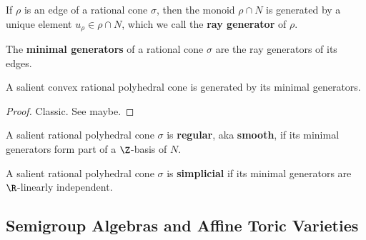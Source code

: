 \begin{definition}
  \label{1-2-ray-gen}

  If $\rho$ is an edge of a rational cone $\sigma$, then the monoid $\rho \cap N$ is generated by a unique element $u_\rho \in \rho \cap N$, which we call the {\bf ray generator} of $\rho$.
\end{definition}


\begin{definition}
  \label{1-2-min-gen}

  The {\bf minimal generators} of a rational cone $\sigma$ are the ray generators of its edges.
\end{definition}


\begin{lemma}
  \label{1-2-15-cone-hull-min-gen}

  A salient convex rational polyhedral cone is generated by its minimal generators.
\end{lemma}
\begin{proof}

  Classic. See \cite{Oda_1988} maybe.
\end{proof}


\begin{definition}
  \label{1-2-16-reg-cone}

  A salient rational polyhedral cone $\sigma$ is {\bf regular}, aka {\bf smooth}, if its minimal generators form part of a $\Z$-basis of $N$.
\end{definition}


\begin{definition}
  \label{1-2-16-simplicial-cone}

  A salient rational polyhedral cone $\sigma$ is {\bf simplicial} if its minimal generators are $\R$-linearly independent.
\end{definition}


\subsection{Semigroup Algebras and Affine Toric Varieties}


